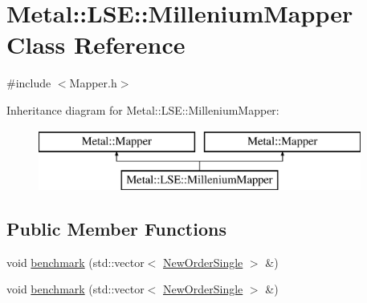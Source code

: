 \hypertarget{classMetal_1_1LSE_1_1MilleniumMapper}{}\section{Metal\+:\+:L\+S\+E\+:\+:Millenium\+Mapper Class Reference}
\label{classMetal_1_1LSE_1_1MilleniumMapper}


{\ttfamily \#include $<$Mapper.\+h$>$}

Inheritance diagram for Metal\+:\+:L\+S\+E\+:\+:Millenium\+Mapper\+:\begin{figure}[H]
\begin{center}
\leavevmode
\includegraphics[height=2.000000cm]{classMetal_1_1LSE_1_1MilleniumMapper}
\end{center}
\end{figure}
\subsection*{Public Member Functions}
\begin{DoxyCompactItemize}
\item 
void \hyperlink{classMetal_1_1LSE_1_1MilleniumMapper_a63d9848ac2d8eb7c5e76e50c2d365c79}{benchmark} (std\+::vector$<$ \hyperlink{classMetal_1_1NewOrderSingle}{New\+Order\+Single} $>$ \&)
\item 
void \hyperlink{classMetal_1_1LSE_1_1MilleniumMapper_a63d9848ac2d8eb7c5e76e50c2d365c79}{benchmark} (std\+::vector$<$ \hyperlink{classMetal_1_1NewOrderSingle}{New\+Order\+Single} $>$ \&)
\end{DoxyCompactItemize}

